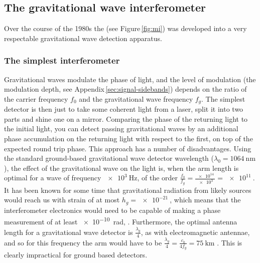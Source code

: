 
\subsection{\label{sec:gw-interferometry}The gravitational wave interferometer}

Over the course of the 1980s the \MI{} (see Figure\,\ref{fig:mi}) was developed into a very respectable gravitational wave detection apparatus.

\subsubsection{The simplest interferometer}
Gravitational waves modulate the phase of light, and the level of modulation (the modulation depth, see Appendix\,\ref{sec:signal-sidebands}) depends on the ratio of the carrier frequency $f_0$ and the gravitational wave frequency $f_g$. The simplest detector is then just to take some coherent light from a laser, split it into two parts and shine one on a mirror. Comparing the phase of the returning light to the initial light, you can detect passing gravitational waves by an additional phase accumulation on the returning light with respect to the first, on top of the expected round trip phase. This approach has a number of disadvantages. Using the standard ground-based gravitational wave detector wavelength ($\lambda_0 = \SI{1064}{\nano\meter}$), the effect of the gravitational wave on the light is, when the arm length is optimal for a wave of frequency $\SI{e3}{\hertz}$, of the order $\frac{f_0}{f_g} = \frac{\SI{e14}{}}{\SI{e3}{}} = \SI{e11}{}$. It has been known for some time  that gravitational radiation from likely sources would reach us with strain of at most $h_g = \SI{e-21}{}$, which means that the interferometer electronics would need to be capable of making a phase measurement of at least \SI{e-10}{\radian}, . Furthermore, the optimal antenna length for a gravitational wave detector is $\frac{\lambda_g}{4}$, as with electromagnetic antennae, and so for this frequency the arm would have to be $\frac{\lambda_g}{4} = \frac{c_0}{4 f_g} = \SI{75}{\kilo\meter}$ \cite{Abbott2016a}. This is clearly impractical for ground based detectors.

